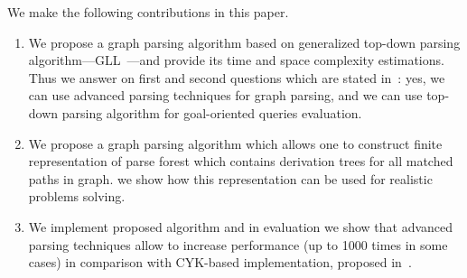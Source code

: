 \documentclass[runningheads,a4paper]{llncs}
\begin{document}
We make the following contributions in this paper.
\begin{enumerate}
\item We propose a graph parsing algorithm based on generalized top-down parsing algorithm---GLL~\cite{scott2010gll}---and provide its time and space complexity estimations.
Thus we answer on first and second questions which are stated in~\cite{Hellings16}: yes, we can use advanced parsing techniques for graph parsing, and we can use top-down parsing algorithm for goal-oriented queries evaluation.
\item We propose a graph parsing algorithm which allows one to construct finite representation of parse forest which contains derivation trees for all matched paths in graph. we show how this representation can be used for realistic problems solving.
\item We implement proposed algorithm and in evaluation we show that advanced parsing techniques allow to increase performance (up to 1000 times in some cases) in comparison with CYK-based implementation, proposed in~\cite{CFGonRDF}.
\end{enumerate}











\end{document}
